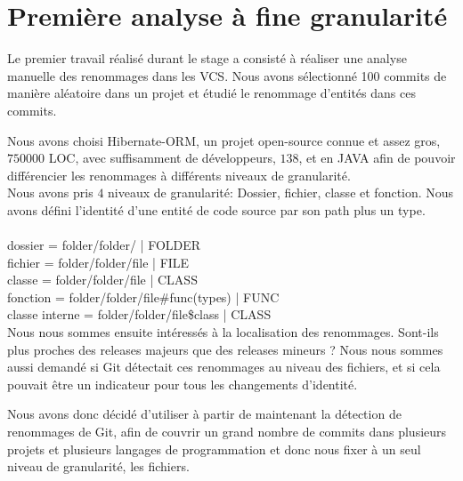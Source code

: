 \section{Première analyse à fine granularité}
\label{sec:analyse_fin_grain}

Le premier travail réalisé durant le stage a consisté à réaliser une analyse manuelle des renommages dans les VCS. Nous avons sélectionné 100 commits de manière aléatoire dans un projet et étudié le renommage d'entités dans ces commits.

Nous avons choisi Hibernate-ORM, un projet open-source connue et assez gros, $750000$ LOC, avec suffisamment de développeurs, $138$, et en JAVA afin de pouvoir différencier les renommages à différents niveaux de granularité.\\
Nous avons pris $4$ niveaux de granularité: Dossier, fichier, classe et fonction. Nous avons défini l'identité d'une entité de code source par son path plus un type. \\\\
dossier = folder/folder/ | FOLDER\\
fichier = folder/folder/file | FILE\\
classe = folder/folder/file | CLASS\\
fonction = folder/folder/file\#func(types) | FUNC\\
classe interne = folder/folder/file\$class | CLASS\\

Nous nous sommes ensuite intéressés à la localisation des renommages. Sont-ils plus proches des releases majeurs que des releases mineurs ? Nous nous sommes aussi demandé si Git détectait ces renommages au niveau des fichiers, et si cela pouvait être un indicateur pour tous les changements d'identité.

Nous avons donc décidé d'utiliser à partir de maintenant la détection de renommages de Git, afin de couvrir un grand nombre de commits dans plusieurs projets et plusieurs langages de programmation et donc nous fixer à un seul niveau de granularité, les fichiers.\\
